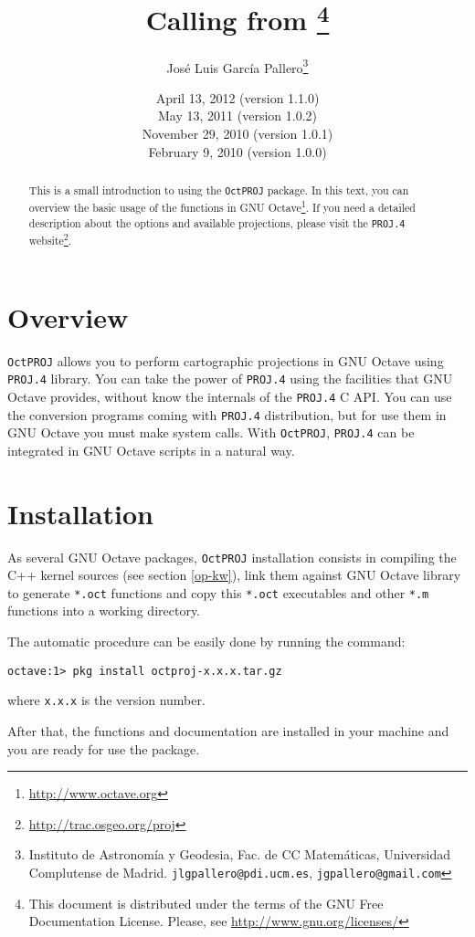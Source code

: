 \documentclass[10pt,a4paper]{article}
\title{\octproj\\Calling \proj{} from \octave\footnote{This document is
       distributed under the terms of the GNU Free Documentation License.
       Please, see \url{http://www.gnu.org/licenses/}}}
\author{Jos\'e Luis Garc\'ia Pallero\footnote{Instituto de Astronom\'ia y
        Geodesia, Fac. de CC Matem\'aticas, Universidad Complutense de Madrid.
        \texttt{jlgpallero@pdi.ucm.es}, \texttt{jgpallero@gmail.com}}}
\date{April 13, 2012 (version 1.1.0)\\
      May 13, 2011 (version 1.0.2)\\
      November 29, 2010 (version 1.0.1)\\
      February 9, 2010 (version 1.0.0)}
\newcommand{\octproj}{\texttt{OctPROJ}}
\newcommand{\proj}{\texttt{PROJ.4}}
\newcommand{\octave}{GNU Octave}
\begin{document}
\maketitle

\nocite{eat-om}
\nocite{projman}
\nocite{projir1}
\nocite{projir2}
\nocite{sny-wm}

\begin{abstract}
This is a small introduction to using the \octproj{} package. In this text, you
can overview the basic usage of the functions in
\octave\footnote{\url{http://www.octave.org}}. If you need a detailed
description about the options and available projections, please visit the
\proj{} website\footnote{\url{http://trac.osgeo.org/proj}}.
\end{abstract}

\section{Overview}

\octproj{} allows you to perform cartographic projections in \octave{} using
\proj{} library. You can take the power of \proj{} using the facilities that
\octave{} provides, without know the internals of the \proj{} C API. You can use
the conversion programs coming with \proj{} distribution, but for use them in
\octave{} you must make system calls. With \octproj{}, \proj{} can be integrated
in \octave{} scripts in a natural way.

\section{Installation}

As several \octave{} packages, \octproj{} installation consists in compiling the
C++ kernel sources (see section \ref{op-kw}), link them against \octave{}
library to generate \texttt{*.oct} functions and copy this \texttt{*.oct}
executables and other \texttt{*.m} functions into a working directory.

The automatic procedure can be easily done by running the command:

\begin{verbatim}
octave:1> pkg install octproj-x.x.x.tar.gz
\end{verbatim}
where \texttt{x.x.x} is the version number.

After that, the functions and documentation are installed in your machine and
you are ready for use the package.
\end{document}
